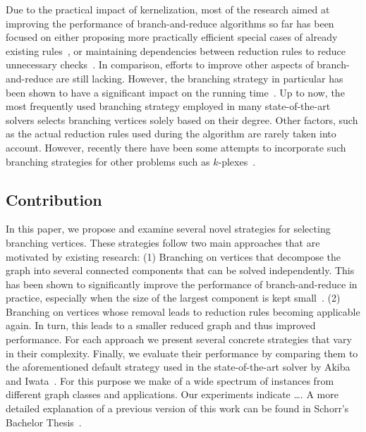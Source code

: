 \documentclass[a4paper,UKenglish,cleveref, autoref, thm-restate]{lipics-v2021}
\begin{document}
Due to the practical impact of kernelization, most of the research aimed at improving the performance of branch-and-reduce algorithms so far has been focused on either proposing more practically efficient special cases of already existing rules~\cite{ChangKern,dahlum2016accelerating}, or maintaining dependencies between reduction rules to reduce unnecessary checks~\cite{alsahafy2020computing,hespe2019scalable}.
In comparison, efforts to improve other aspects of branch-and-reduce are still lacking.
However, the branching strategy in particular has been shown to have a significant impact on the running time~\cite{AkibaIwata}.
Up to now, the most frequently used branching strategy employed in many state-of-the-art solvers selects branching vertices solely based on their degree.
Other factors, such as the actual reduction rules used during the algorithm are rarely taken into account.
However, recently there have been some attempts to incorporate such branching strategies for other problems such as $k$-plexes~\cite{gao2018exact}.

\subsection{Contribution}
In this paper, we propose and examine several novel strategies for selecting branching vertices.
These strategies follow two main approaches that are motivated by existing research: (1) Branching on vertices that decompose the graph into several connected components that can be solved independently.
This has been shown to significantly improve the performance of branch-and-reduce in practice, especially when the size of the largest component is kept small~\cite{alsahafy2020computing}.
(2) Branching on vertices whose removal leads to reduction rules becoming applicable again.
In turn, this leads to a smaller reduced graph and thus improved performance.
For each approach we present several concrete strategies that vary in their complexity.
Finally, we evaluate their performance by comparing them to the aforementioned default strategy used in the state-of-the-art solver by Akiba and Iwata~\cite{AkibaIwata}.
For this purpose we make of a wide spectrum of instances from different graph classes and applications.
Our experiments indicate \ldots {}.
A more detailed explanation of a previous version of this work
can be found in Schorr's Bachelor Thesis~\cite{schorr2020improved}.
\end{document}
